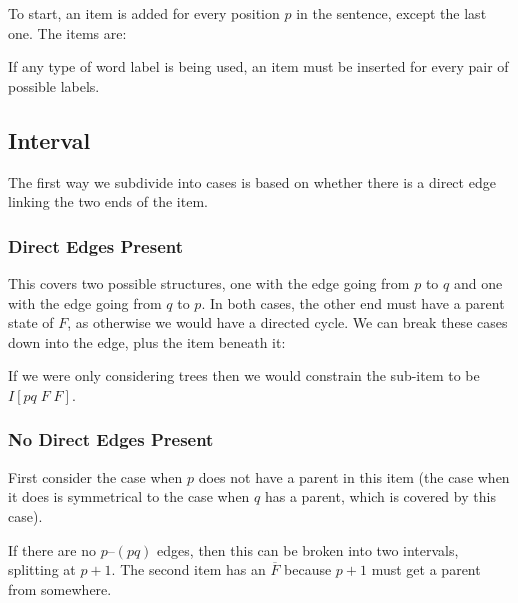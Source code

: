 To start, an item is added for every position $p$ in the sentence, except the last one. The items are:


If any type of word label is being used, an item must be inserted for every pair of possible labels.

\subsection{Interval}
The first way we subdivide into cases is based on whether there is a direct edge linking the two ends of the item.

\subsubsection{Direct Edges Present}

\begin{center}
\end{center}

This covers two possible structures, one with the edge going from $p$ to $q$ and one with the edge going from $q$ to $p$.
In both cases, the other end must have a parent state of $F$, as otherwise we would have a directed cycle.
We can break these cases down into the edge, plus the item beneath it:


If we were only considering trees then we would constrain the sub-item to be $I[pq \; F \; F]$.

\subsubsection{No Direct Edges Present}

First consider the case when $p$ does not have a parent in this item (the case when it does is symmetrical to the case when $q$ has a parent, which is covered by this case).

If there are no $p$--$(pq)$ edges, then this can be broken into two intervals, splitting at $p+1$.
The second item has an $\overline{F}$ because $p+1$ must get a parent from somewhere.

